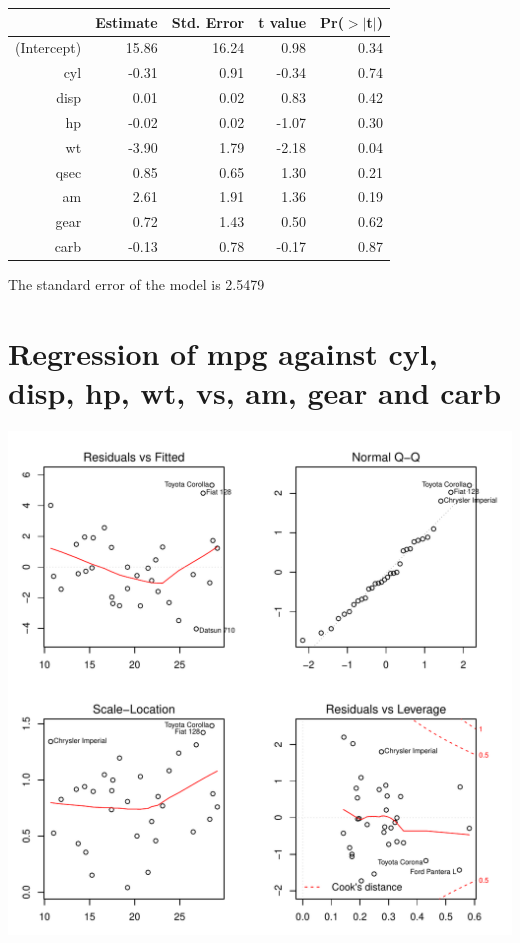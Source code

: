 \documentclass{article}\usepackage[]{graphicx}\usepackage[]{color}
\makeatletter
\def\maxwidth{ %
  \ifdim\Gin@nat@width>\linewidth
    \linewidth
  \else
    \Gin@nat@width
  \fi
}
\newenvironment{knitrout}{}{} %
\makeatother
\begin{document}
\begin{table}[ht]
\centering
\begin{tabular}{rrrrr}
  \hline
 & Estimate & Std. Error & t value & Pr($>$$|$t$|$) \\ 
  \hline
(Intercept) & 15.86 & 16.24 & 0.98 & 0.34 \\ 
  cyl & -0.31 & 0.91 & -0.34 & 0.74 \\ 
  disp & 0.01 & 0.02 & 0.83 & 0.42 \\ 
  hp & -0.02 & 0.02 & -1.07 & 0.30 \\ 
  wt & -3.90 & 1.79 & -2.18 & 0.04 \\ 
  qsec & 0.85 & 0.65 & 1.30 & 0.21 \\ 
  am & 2.61 & 1.91 & 1.36 & 0.19 \\ 
  gear & 0.72 & 1.43 & 0.50 & 0.62 \\ 
  carb & -0.13 & 0.78 & -0.17 & 0.87 \\ 
   \hline
\end{tabular}
\end{table}




The standard error of the model is 2.5479

\newpage

\section{Regression of mpg against cyl, disp, hp, wt, vs, am, gear and carb }
\begin{knitrout}
\color{fgcolor}

{\centering \includegraphics[width=\maxwidth]{figure/lm-cyl-disp-hp-wt-vs-am-gear-carb} 

}



\end{knitrout}
\end{document}
